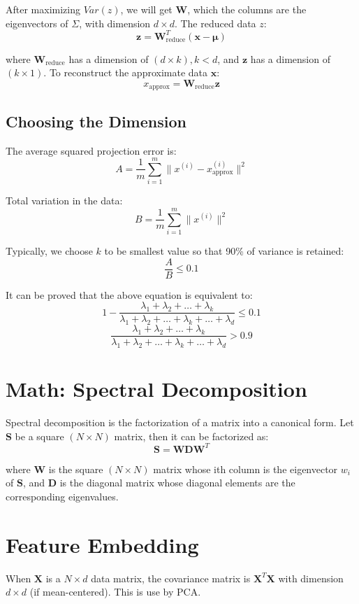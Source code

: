 \begin{multicols}{2}
\noindent After maximizing $Var(z)$, we will get $\mathbf{W}$, which the columns are the eigenvectors of $\Sigma$, with dimension $d\times d$. The reduced data $z$:
$$\mathbf{z} = \mathbf{W}_{\text{reduce}}^{T} (\mathbf{x} - \mathbf{\mu})$$

\noindent where $\mathbf{W}_{\text{reduce}}$ has a dimension of $(d\times k), k<d$, and $\mathbf{z}$ has a dimension of $(k\times 1)$. To reconstruct the approximate data $\mathbf{x}$:
$$x_{\text{approx}} = \mathbf{W}_{\text{reduce}} \mathbf{z}$$

\subsection{Choosing the Dimension}

\noindent The average squared projection error is:
$$A = \frac{1}{m} \sum_{i=1}^m \| x^{(i)} - x^{(i)}_{\text{approx}}\|^2$$

\noindent Total variation in the data:
$$B = \frac{1}{m} \sum_{i=1}^m \| x^{(i)}\|^2$$

\noindent Typically, we choose $k$ to be smallest value so that 90\% of variance is retained:
$$\frac{A}{B} \le 0.1$$

\noindent It can be proved that the above equation is equivalent to:
$$1 - \frac{\lambda_1+\lambda_2+\ldots+\lambda_k}{\lambda_1+\lambda_2+\ldots+\lambda_k+\ldots+\lambda_d} \le 0.1$$
$$\frac{\lambda_1+\lambda_2+\ldots+\lambda_k}{\lambda_1+\lambda_2+\ldots+\lambda_k+\ldots+\lambda_d} > 0.9$$

\section{Math: Spectral Decomposition}
\noindent Spectral decomposition is the factorization of a matrix into a canonical form. Let $\mathbf{S}$ be a square $(N\times N)$ matrix, then it can be factorized as:
$$\mathbf{S}=\mathbf{WDW}^{T}$$

\noindent where $\mathbf{W}$ is the square $(N\times N)$ matrix whose ith column is the eigenvector $w_i$ of $\mathbf{S}$, and $\mathbf{D}$ is the diagonal matrix whose diagonal elements are the corresponding eigenvalues.

\section{Feature Embedding}
\noindent When $\mathbf{X}$ is a $N\times d$ data matrix, the covariance matrix is $\mathbf{X}^{T} \mathbf{X}$ with dimension $d\times d$ (if mean-centered). This is use by PCA. \\


\end{multicols}
